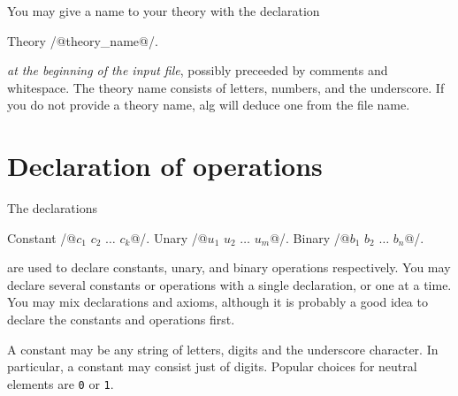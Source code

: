 \documentclass{report}
\begin{document}
You may give a name to your theory with the declaration
%
\begin{alg}
Theory /@theory_name@/.
\end{alg}
%
\emph{at the beginning of the input file}, possibly preceeded by
comments and whitespace. The theory name consists of letters, numbers,
and the underscore. If you do not provide a theory name, alg will
deduce one from the file name.

\section{Declaration of operations}

The declarations
%
\begin{alg}
Constant /@$c_1$ $c_2$ $\ldots$ $c_k$@/.
Unary /@$u_1$ $u_2$ $\ldots$ $u_m$@/.
Binary /@$b_1$ $b_2$ $\ldots$ $b_n$@/.
\end{alg}
%
are used to declare constants, unary, and binary operations
respectively. You may declare several constants or operations with a
single declaration, or one at a time. You may mix declarations and
axioms, although it is probably a good idea to declare the constants
and operations first.

A constant may be any string of letters, digits and the underscore
character. In particular, a constant may consist just of digits.
Popular choices for neutral elements are \texttt{0} or \texttt{1}.
\end{document}
